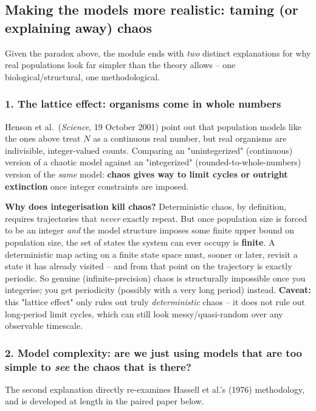 \documentclass[11pt,a4paper]{article}
\begin{document}
\subsection{Making the models more realistic: taming (or explaining away) chaos}
Given the paradox above, the module ends with \emph{two} distinct explanations for why real populations look far simpler than the theory allows -- one biological/structural, one methodological.

\subsubsection*{1. The lattice effect: organisms come in whole numbers}
Henson et al.\ (\emph{Science}, 19 October 2001) point out that population models like the ones above treat $N$ as a continuous real number, but real organisms are indivisible, integer-valued counts. Comparing an "unintegerized" (continuous) version of a chaotic model against an "integerized" (rounded-to-whole-numbers) version of the \emph{same} model: \textbf{chaos gives way to limit cycles or outright extinction} once integer constraints are imposed.

\begin{keybox}
\textbf{Why does integerisation kill chaos?} Deterministic chaos, by definition, requires trajectories that \emph{never} exactly repeat. But once population size is forced to be an integer \emph{and} the model structure imposes some finite upper bound on population size, the set of states the system can ever occupy is \textbf{finite}. A deterministic map acting on a finite state space must, sooner or later, revisit a state it has already visited -- and from that point on the trajectory is exactly periodic. So genuine (infinite-precision) chaos is structurally impossible once you integerise; you get periodicity (possibly with a very long period) instead. \textbf{Caveat:} this "lattice effect" only rules out truly \emph{deterministic} chaos -- it does not rule out long-period limit cycles, which can still look messy/quasi-random over any observable timescale.
\end{keybox}

\subsubsection*{2. Model complexity: are we just using models that are too simple to \emph{see} the chaos that is there?}
The second explanation directly re-examines Hassell et al.'s (1976) methodology, and is developed at length in the paired paper below.
\end{document}
